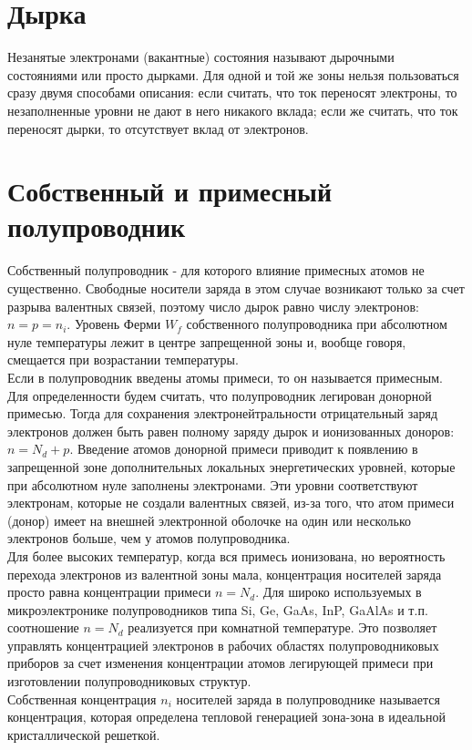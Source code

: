 \begin{multicols*}{2}
		\section{Дырка}
		Незанятые электронами (вакантные) состояния называют дырочными состояниями или просто дырками. Для одной и той же зоны нельзя пользоваться сразу двумя способами описания: если считать, что ток переносят электроны, то незаполненные уровни не дают в него никакого вклада; если же считать, что ток переносят дырки, то отсутствует вклад от электронов.

		\section{Собственный и примесный полупроводник}
		Собственный полупроводник - для которого влияние примесных атомов не существенно. Свободные носители заряда в этом случае возникают только за счет разрыва валентных связей, поэтому число дырок равно числу электронов: $n = p = n_i$. Уровень Ферми $W_f$ собственного полупроводника при абсолютном нуле
		температуры лежит в центре запрещенной зоны и, вообще говоря, смещается при возрастании температуры.\\ 
		Если в полупроводник введены атомы примеси, то он называется примесным. Для определенности будем считать, что полупроводник легирован донорной примесью. Тогда для сохранения электронейтральности отрицательный заряд электронов должен быть равен полному заряду дырок и ионизованных доноров: $n = N_d + p$. Введение атомов донорной примеси приводит к появлению в запрещенной зоне дополнительных локальных энергетических уровней, которые при абсолютном нуле заполнены электронами. Эти уровни соответствуют электронам, которые не создали валентных связей, из-за того, что атом примеси (донор) имеет на внешней электронной оболочке на один или несколько электронов больше, чем у атомов полупроводника.\\
		Для более высоких температур, когда вся примесь ионизована, но вероятность перехода электронов из валентной зоны мала, концентрация носителей
		заряда просто равна концентрации примеси $n=N_d$. Для широко используемых в микроэлектронике полупроводников типа Si, Ge, GaAs, InP, GaAlAs и т.п. соотношение $n=N_d$ реализуется при комнатной температуре. Это позволяет управлять концентрацией электронов в рабочих областях полупроводниковых приборов за счет изменения концентрации атомов легирующей примеси при изготовлении полупроводниковых структур.\\
		Собственная концентрация $n_i$ носителей заряда в полупроводнике называется концентрация, которая определена тепловой генерацией зона-зона в идеальной кристаллической решеткой.


\end{multicols*}
